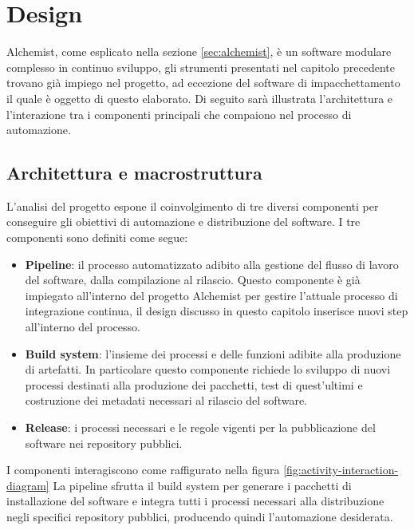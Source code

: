 \chapter{Design}

Alchemist, come esplicato nella sezione \ref{sec:alchemist}, è un software modulare complesso in continuo sviluppo, gli strumenti presentati nel capitolo precedente trovano già impiego nel progetto, ad eccezione del software di impacchettamento il quale è oggetto di questo elaborato. Di seguito sarà illustrata l'architettura e l'interazione tra i componenti principali che compaiono nel processo di automazione.

\section{Architettura e macrostruttura}

L'analisi del progetto espone il coinvolgimento di tre diversi componenti per conseguire gli obiettivi di automazione e distribuzione del software. I tre componenti sono definiti come segue: 
\begin{itemize}
	\item \textbf{Pipeline}: il processo automatizzato adibito alla gestione del flusso di lavoro del software, dalla compilazione al rilascio. Questo componente è già impiegato all'interno del progetto Alchemist per gestire l'attuale processo di integrazione continua, il design discusso in questo capitolo inserisce nuovi step all'interno del processo.
	\item \textbf{Build system}: l'insieme dei processi e delle funzioni adibite alla produzione di artefatti. In particolare questo componente richiede lo sviluppo di nuovi processi destinati alla produzione dei pacchetti, test di quest'ultimi e costruzione dei metadati necessari al rilascio del software.
	\item \textbf{Release}: i processi necessari e le regole vigenti per la pubblicazione del software nei repository pubblici.
\end{itemize}
I componenti interagiscono come raffigurato nella figura \ref{fig:activity-interaction-diagram} La pipeline sfrutta il build system per generare i pacchetti di installazione del software e integra tutti i processi necessari alla distribuzione negli specifici repository pubblici, producendo quindi l'automazione desiderata.

